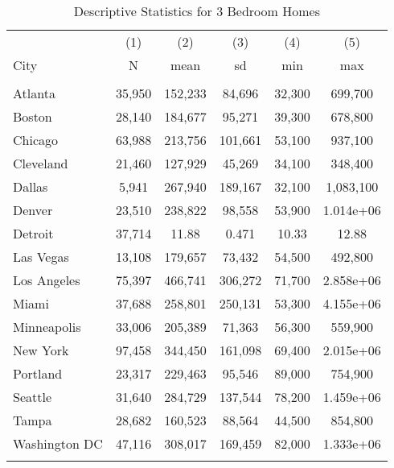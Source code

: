 \begin{table}
\begin{centering}
\caption{Descriptive Statistics for 3 Bedroom Homes}\label{tab:1bed}
\begin{tabular}{lccccc} \hline
 & (1) & (2) & (3) & (4) & (5) \\
City & N & mean & sd & min & max \\ \hline
 &  &  &  &  &  \\
 Atlanta            & 35,950 & 152,233 & 84,696 & 32,300 & 699,700 \\
 Boston             & 28,140 & 184,677 & 95,271 & 39,300 & 678,800 \\
 Chicago            & 63,988 & 213,756 & 101,661 & 53,100 & 937,100 \\
 Cleveland          & 21,460 & 127,929 & 45,269 & 34,100 & 348,400 \\
 Dallas             & 5,941   & 267,940 &   189,167    &  32,100 &   1,083,100\\
 Denver             & 23,510 & 238,822 & 98,558 & 53,900 & 1.014e+06 \\
 Detroit            & 37,714 & 11.88 & 0.471 & 10.33 & 12.88 \\
 Las Vegas          & 13,108 & 179,657 & 73,432 & 54,500 & 492,800 \\
 Los Angeles        & 75,397 & 466,741 & 306,272 & 71,700 & 2.858e+06 \\
 Miami              & 37,688 & 258,801 & 250,131 & 53,300 & 4.155e+06 \\
 Minneapolis        & 33,006 & 205,389 & 71,363 & 56,300 & 559,900 \\
 New York           & 97,458 & 344,450 & 161,098 & 69,400 & 2.015e+06 \\
 Portland           & 23,317 & 229,463 & 95,546 & 89,000 & 754,900 \\
 Seattle            & 31,640 & 284,729 & 137,544 & 78,200 & 1.459e+06 \\
 Tampa              & 28,682 & 160,523 & 88,564 & 44,500 & 854,800 \\
 Washington DC      & 47,116 & 308,017 & 169,459 & 82,000 & 1.333e+06 \\


  &  &  &  &  &  \\ \hline
\end{tabular}
\end{centering}
\end{table}

